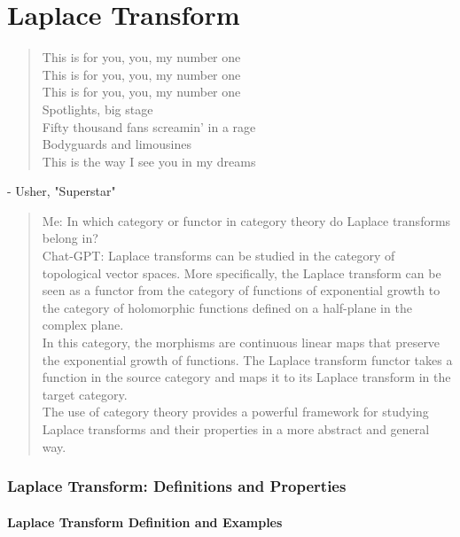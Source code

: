 \part{Laplace Transform}


\begin{quotation}
This is for you, you, my number one \\
This is for you, you, my number one \\

This is for you, you, my number one \\

Spotlights, big stage \\
Fifty thousand fans screamin' in a rage \\
Bodyguards and limousines \\
This is the way I see you in my dreams \\
\end{quotation}
- Usher, "Superstar" \\

\begin{quotation}
Me: In which category or functor in category theory do Laplace transforms belong in? \\

Chat-GPT: Laplace transforms can be studied in the category of topological vector spaces. More specifically, the Laplace transform can be seen as a functor from the category of functions of exponential growth to the category of holomorphic functions defined on a half-plane in the complex plane. \\

In this category, the morphisms are continuous linear maps that preserve the exponential growth of functions. The Laplace transform functor takes a function in the source category and maps it to its Laplace transform in the target category. \\

The use of category theory provides a powerful framework for studying Laplace transforms and their properties in a more abstract and general way.
\end{quotation}

\section{Laplace Transform: Definitions and Properties}

\subsection{Laplace Transform Definition and Examples}

